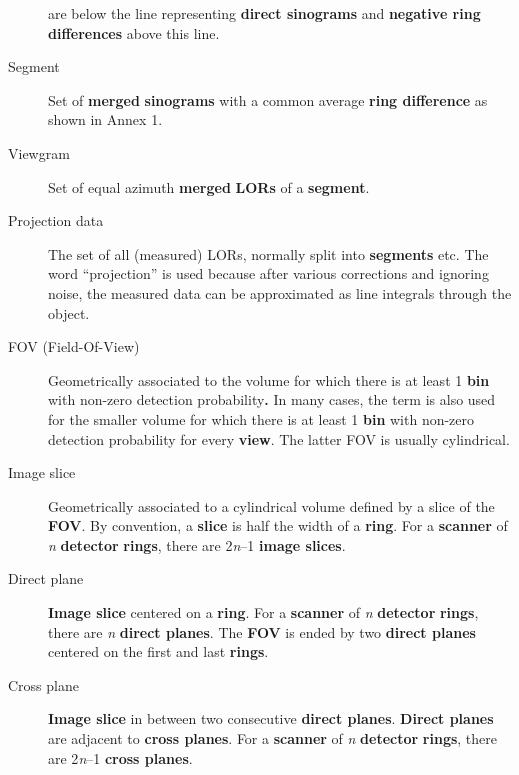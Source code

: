 \documentclass{article}
\begin{document}
\begin{description}
are below the line representing \textbf{direct sinograms} and \textbf{negative 
ring differences} above this line.
\item[Segment] 
Set of \textbf{merged} \textbf{sinograms} with a common average \textbf{ring 
difference} as shown in Annex 1.
\item[Viewgram] 
Set of equal azimuth \textbf{merged} \textbf{LORs} of a \textbf{segment}.
\item[Projection data]
The set of all (measured) LORs, normally split into \textbf{segments} etc.
The word ``projection'' is used because after various corrections and
ignoring noise, the measured data can be approximated as line integrals 
through the object.
\item[FOV (Field-Of-View)] 
Geometrically associated to the volume for which there is at 
least 1 \textbf{bin} with non-zero detection probability\textbf{.} In many 
cases, the term is also used for the smaller volume for which 
there is at least 1 \textbf{bin} with non-zero detection probability 
for every \textbf{view}. The latter FOV is usually cylindrical.
\item[Image slice] 
Geometrically associated to a cylindrical volume defined by 
a slice of the \textbf{FOV}. By convention, a \textbf{slice} is half the 
width of a \textbf{ring}. For a \textbf{scanner} of \textit{n} \textbf{detector} \textbf{rings}, 
there are 2\textit{n}--1 \textbf{image slices}.
\item[Direct plane] 
\textbf{Image slice} centered on a \textbf{ring}. For a \textbf{scanner} of \textit{n} \textbf{detector} \textbf{rings}, 
there are \textit{n} \textbf{direct planes}. The \textbf{FOV} is ended by two \textbf{direct 
planes} centered on the first and last \textbf{rings}.
\item[Cross plane] 
\textbf{Image slice} in between two consecutive \textbf{direct planes}. \textbf{Direct 
planes} are adjacent to \textbf{cross planes}. For a \textbf{scanner} of \textit{n} \textbf{detector} \textbf{rings}, 
there are 2\textit{n}--1 \textbf{cross planes}.

\end{description}
\end{document}
